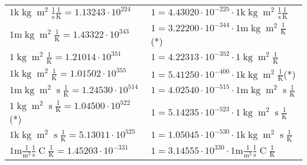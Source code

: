\begin{center}
\begin{longtable}{l l}
{\color{gray}$1 \bm{\mathrm{ k}}\operatorname{kg}{\operatorname{m}^2}\frac1{\operatorname{s}}{}\frac1{\operatorname{K}} = 1.13243\cdot10^{224} $}   & {\color{gray}$ 1 = 4.43020\cdot10^{-225} \cdot 1 \bm{\mathrm{ k}}\operatorname{kg}{\operatorname{m}^2}\frac1{\operatorname{s}}{}\frac1{\operatorname{K}}$}  \\
{\color{gray}$1 \bm{\mathrm{ m}}\operatorname{kg}{\operatorname{m}^2}{}{}\frac1{\operatorname{K}} = 1.43322\cdot10^{343} $}   & {\color{gray}$ 1 = 3.22200\cdot10^{-344} \cdot 1 \bm{\mathrm{ m}}\operatorname{kg}{\operatorname{m}^2}{}{}\frac1{\operatorname{K}}$}\quad(*)\\
{\color{black}$1 \bm{\mathrm{ }}\operatorname{kg}{\operatorname{m}^2}{}{}\frac1{\operatorname{K}} = 1.21014\cdot10^{351} $}   & {\color{black}$ 1 = 4.22313\cdot10^{-352} \cdot 1 \bm{\mathrm{ }}\operatorname{kg}{\operatorname{m}^2}{}{}\frac1{\operatorname{K}}$}  \\
{\color{gray}$1 \bm{\mathrm{ k}}\operatorname{kg}{\operatorname{m}^2}{}{}\frac1{\operatorname{K}} = 1.01502\cdot10^{355} $}   & {\color{gray}$ 1 = 5.41250\cdot10^{-400} \cdot 1 \bm{\mathrm{ k}}\operatorname{kg}{\operatorname{m}^2}{}{}\frac1{\operatorname{K}}$}\quad(*)\\
{\color{gray}$1 \bm{\mathrm{ m}}\operatorname{kg}{\operatorname{m}^2}{\operatorname{s}}{}\frac1{\operatorname{K}} = 1.24530\cdot10^{514} $}   & {\color{gray}$ 1 = 4.02540\cdot10^{-515} \cdot 1 \bm{\mathrm{ m}}\operatorname{kg}{\operatorname{m}^2}{\operatorname{s}}{}\frac1{\operatorname{K}}$}  \\
{\color{black}$1 \bm{\mathrm{ }}\operatorname{kg}{\operatorname{m}^2}{\operatorname{s}}{}\frac1{\operatorname{K}} = 1.04500\cdot10^{522} $}\quad(*) & {\color{black}$ 1 = 5.14235\cdot10^{-523} \cdot 1 \bm{\mathrm{ }}\operatorname{kg}{\operatorname{m}^2}{\operatorname{s}}{}\frac1{\operatorname{K}}$}  \\
{\color{gray}$1 \bm{\mathrm{ k}}\operatorname{kg}{\operatorname{m}^2}{\operatorname{s}}{}\frac1{\operatorname{K}} = 5.13011\cdot10^{525} $}   & {\color{gray}$ 1 = 1.05045\cdot10^{-530} \cdot 1 \bm{\mathrm{ k}}\operatorname{kg}{\operatorname{m}^2}{\operatorname{s}}{}\frac1{\operatorname{K}}$}  \\
\hline{\color{gray}$1 \bm{\mathrm{ m}}\frac1{\operatorname{m}^3}\frac1{\operatorname{s}}{\operatorname{C}}\frac1{\operatorname{K}} = 1.45203\cdot10^{-331} $}   & {\color{gray}$ 1 = 3.14555\cdot10^{330} \cdot 1 \bm{\mathrm{ m}}\frac1{\operatorname{m}^3}\frac1{\operatorname{s}}{\operatorname{C}}\frac1{\operatorname{K}}$}  \\

\end{longtable}
\end{center}
